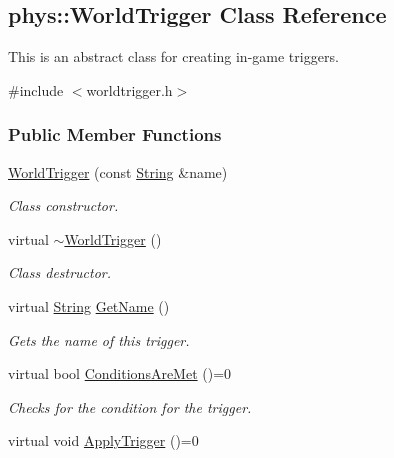 \hypertarget{classphys_1_1WorldTrigger}{
\subsection{phys::WorldTrigger Class Reference}
\label{classphys_1_1WorldTrigger}
}


This is an abstract class for creating in-\/game triggers.  




{\ttfamily \#include $<$worldtrigger.h$>$}

\subsubsection*{Public Member Functions}
\begin{DoxyCompactItemize}
\item 
\hyperlink{classphys_1_1WorldTrigger_a1876d1c7c58b10b2fd1ad1cb7727e6a6}{WorldTrigger} (const \hyperlink{namespacephys_aa03900411993de7fbfec4789bc1d392e}{String} \&name)
\begin{DoxyCompactList}\small\item\em Class constructor. \item\end{DoxyCompactList}\item 
\hypertarget{classphys_1_1WorldTrigger_ad70dd18dc895166db6cc890042b0203f}{
virtual \hyperlink{classphys_1_1WorldTrigger_ad70dd18dc895166db6cc890042b0203f}{$\sim$WorldTrigger} ()}
\label{classphys_1_1WorldTrigger_ad70dd18dc895166db6cc890042b0203f}

\begin{DoxyCompactList}\small\item\em Class destructor. \item\end{DoxyCompactList}\item 
virtual \hyperlink{namespacephys_aa03900411993de7fbfec4789bc1d392e}{String} \hyperlink{classphys_1_1WorldTrigger_a01805ed31ae69ade9e4ef21bef5f341e}{GetName} ()
\begin{DoxyCompactList}\small\item\em Gets the name of this trigger. \item\end{DoxyCompactList}\item 
virtual bool \hyperlink{classphys_1_1WorldTrigger_aa95304a06027cd15bf56ad018c7adda8}{ConditionsAreMet} ()=0
\begin{DoxyCompactList}\small\item\em Checks for the condition for the trigger. \item\end{DoxyCompactList}\item 
\hypertarget{classphys_1_1WorldTrigger_adb7801edf1195f2f7791ad9c4d91af88}{
virtual void \hyperlink{classphys_1_1WorldTrigger_adb7801edf1195f2f7791ad9c4d91af88}{ApplyTrigger} ()=0}
\label{classphys_1_1WorldTrigger_adb7801edf1195f2f7791ad9c4d91af88}


\end{DoxyCompactItemize}
